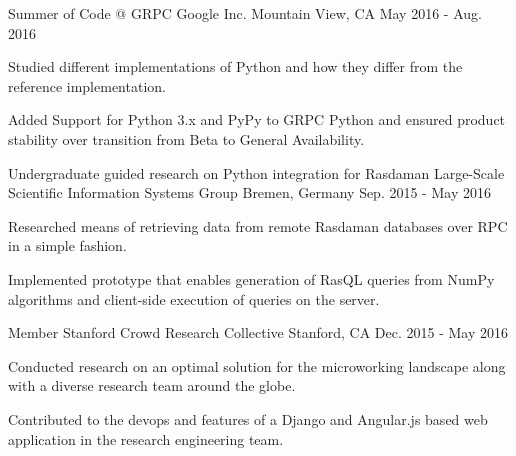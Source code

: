 

\begin{cventries}
  \cventry
    {Summer of Code @ GRPC} %
    {Google Inc.} %
    {Mountain View, CA} %
    {May 2016 - Aug. 2016} %
    {
      \begin{cvitems} %
        \item {Studied different implementations of Python and how they differ from the reference implementation.}
        \item {Added Support for Python 3.x and PyPy to GRPC Python and ensured product stability over transition from Beta to General Availability.}
      \end{cvitems}
    }
  \cventry
    {Undergraduate guided research on Python integration for Rasdaman} %
    {Large-Scale Scientific Information Systems Group} %
    {Bremen, Germany} %
    {Sep. 2015 - May 2016} %
    {
      \begin{cvitems} %
        \item {Researched means of retrieving data from remote Rasdaman databases over RPC in a simple fashion.}
        \item {Implemented prototype that enables generation of RasQL queries from NumPy algorithms and client-side execution of queries on the server.}
      \end{cvitems} 
    }
\cventry
  {Member} %
  {Stanford Crowd Research Collective} %
  {Stanford, CA} %
  {Dec. 2015 - May 2016} %
  {
    \begin{cvitems} %
      \item {Conducted research on an optimal solution for the microworking landscape along with a diverse research team around the globe.}
      \item {Contributed to the devops and features of a Django and Angular.js based web application in the research engineering team.}

\end{cvitems}}
\end{cventries}
